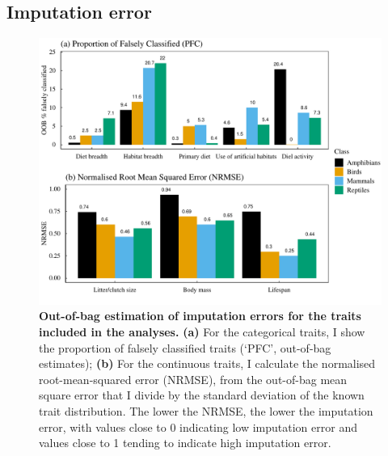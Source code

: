 

\subsection{Imputation error}

\begin{figure}[h!]
\centering
\includegraphics[scale=0.7]{Supporting/Chapter4/Figures/Imputation_errors}
\caption[Out-of-bag estimation of imputation errors for the traits included in the analyses]{\textbf{Out-of-bag estimation of imputation errors for the traits included in the analyses.} \textbf{(a)} For the categorical traits, I show the proportion of falsely classified traits (`PFC', out-of-bag estimates); \textbf{(b)} For the continuous traits, I calculate the normalised root-mean-squared error (NRMSE), from the out-of-bag mean square error that I divide by the standard deviation of the known trait distribution. The lower the NRMSE, the lower the imputation error, with values close to 0 indicating low imputation error and values close to 1 tending to indicate high imputation error.} 
\label{SI_4_Figure2}
\end{figure}



